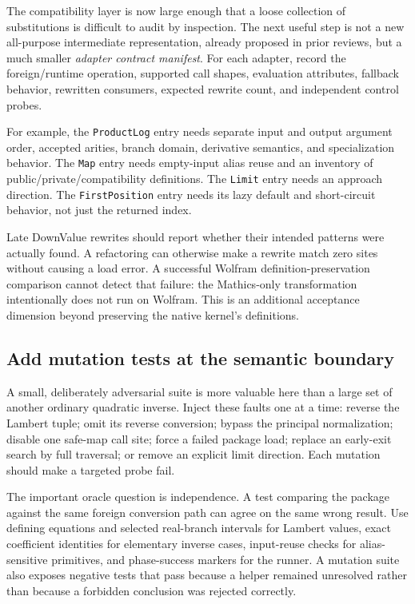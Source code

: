 \documentclass[11pt,letterpaper]{article}
\newcommand{\code}[1]{\texttt{#1}}
\begin{document}
The compatibility layer is now large enough that a loose collection of substitutions is difficult to audit by inspection. The next useful step is not a new all-purpose intermediate representation, already proposed in prior reviews, but a much smaller \emph{adapter contract manifest}. For each adapter, record the foreign/runtime operation, supported call shapes, evaluation attributes, fallback behavior, rewritten consumers, expected rewrite count, and independent control probes.

For example, the \code{ProductLog} entry needs separate input and output argument order, accepted arities, branch domain, derivative semantics, and specialization behavior. The \code{Map} entry needs empty-input alias reuse and an inventory of public/private/compatibility definitions. The \code{Limit} entry needs an approach direction. The \code{FirstPosition} entry needs its lazy default and short-circuit behavior, not just the returned index.

Late DownValue rewrites should report whether their intended patterns were actually found. A refactoring can otherwise make a rewrite match zero sites without causing a load error. A successful Wolfram definition-preservation comparison cannot detect that failure: the Mathics-only transformation intentionally does not run on Wolfram. This is an additional acceptance dimension beyond preserving the native kernel's definitions.

\subsection{Add mutation tests at the semantic boundary}

A small, deliberately adversarial suite is more valuable here than a large set of another ordinary quadratic inverse. Inject these faults one at a time: reverse the Lambert tuple; omit its reverse conversion; bypass the principal normalization; disable one safe-map call site; force a failed package load; replace an early-exit search by full traversal; or remove an explicit limit direction. Each mutation should make a targeted probe fail.

The important oracle question is independence. A test comparing the package against the same foreign conversion path can agree on the same wrong result. Use defining equations and selected real-branch intervals for Lambert values, exact coefficient identities for elementary inverse cases, input-reuse checks for alias-sensitive primitives, and phase-success markers for the runner. A mutation suite also exposes negative tests that pass because a helper remained unresolved rather than because a forbidden conclusion was rejected correctly.
\end{document}
